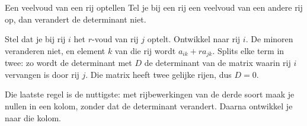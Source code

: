 \begin{theorie}
\begin{stelling}{Een veelvoud van een rij optellen}
Tel je bij een rij een veelvoud van een andere rij op, dan verandert de determinant niet.
\end{stelling}

\begin{bewijs}
Stel dat je bij rij $i$ het $r$-voud van rij $j$ optelt. Ontwikkel naar rij $i$. De minoren veranderen niet, en element $k$ van die rij wordt $a_{ik} + ra_{jk}$. Splits elke term in twee: zo wordt de determinant
met $D$ de determinant van de matrix waarin rij $i$ vervangen is door rij $j$. Die matrix heeft twee gelijke rijen, dus $D = 0$.
\end{bewijs}
\end{theorie}

Die laatste regel is de nuttigste: met rijbewerkingen van de derde soort maak je nullen in een kolom, zonder dat de determinant verandert. Daarna ontwikkel je naar die kolom.


